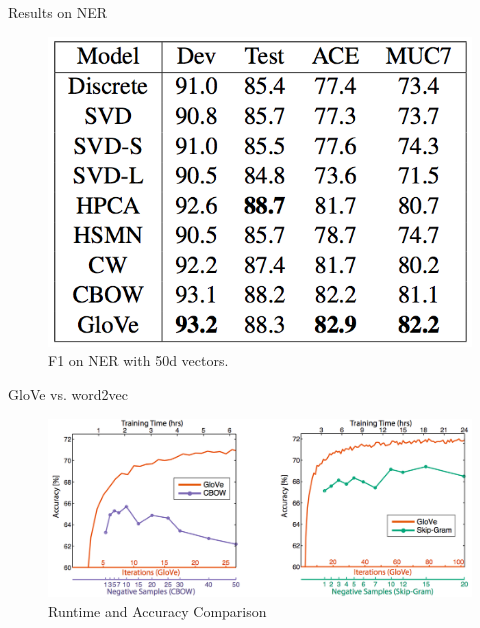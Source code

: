 \begin{frame}{Results on NER}
  \begin{figure}
    \includegraphics[scale=0.4]{images/ner.png}
    \caption{F1 on NER with 50d vectors.}
  \end{figure}
\end{frame}

\begin{frame}{GloVe vs. word2vec}
  \begin{figure}
    \centering
    \includegraphics[scale=0.29]{images/gloveVSword2vec.png}
    \caption{Runtime and Accuracy Comparison}
  \end{figure}
\end{frame}

